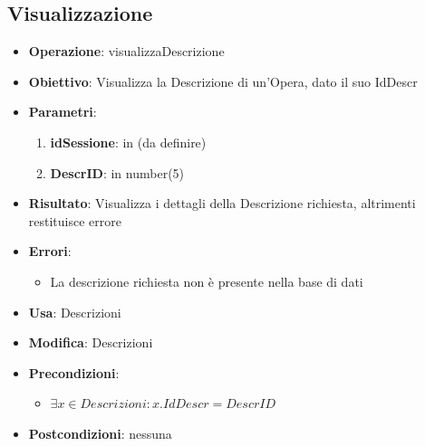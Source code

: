 \documentclass[a4paper,11pt]{article}
\begin{document}
\subsection{Visualizzazione}
\begin{itemize}
	\item \textbf{Operazione}: visualizzaDescrizione
	\item \textbf{Obiettivo}: Visualizza la Descrizione di un'Opera, dato il suo IdDescr
	\item \textbf{Parametri}:
	\begin{enumerate}
		\item \textbf{idSessione}: in (da definire)
		\item \textbf{DescrID}: in number(5)
	\end{enumerate}
	\item \textbf{Risultato}: Visualizza i dettagli della Descrizione richiesta, altrimenti restituisce errore
	\item \textbf{Errori}: 
	\begin{itemize}
		\item La descrizione richiesta non è presente nella base di dati
	\end{itemize}
	\item \textbf{Usa}: Descrizioni
	\item \textbf{Modifica}: Descrizioni
	\item \textbf{Precondizioni}:
	\begin{itemize}
		\item $\exists x \in Descrizioni : x.IdDescr = DescrID$
	\end{itemize}
	\item \textbf{Postcondizioni}: nessuna
\end{itemize}

\end{document}
